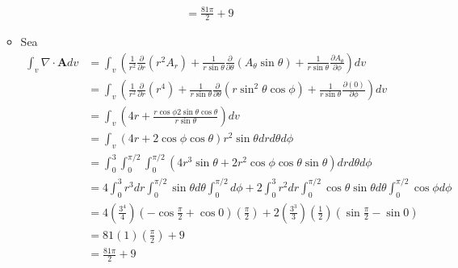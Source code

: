 \begin{problema}
\begin{enumerate}
\begin{sol}
\begin{itemize}
\begin{align*}
                &= \frac{81\pi}{2}+9
            \end{align*}
            \item Sea 
            \begin{align*}
                \int_{v} \nabla \cdot \mathbf{A} d v &=\int_v\left(\frac{1}{r^2}\frac{\partial}{\partial r}(r^2 A_r)+\frac{1}{r\sin\theta}\frac{\partial }{\partial \theta}(A_\theta \sin \theta)+\frac{1}{r\sin \theta}\frac{\partial A_\theta}{\partial \phi}\right)dv\\
                &=\int_v\left(\frac{1}{r^2}\frac{\partial}{\partial r}(r^4)+\frac{1}{r\sin\theta}\frac{\partial }{\partial \theta}(r\sin^2 \theta\cos\phi)+\frac{1}{r\sin \theta}\frac{\partial (0)}{\partial \phi}\right)dv\\
                &=\int_v\left(4r+\frac{r\cos\phi2\sin\theta \cos\theta}{r\sin\theta }\right)dv\\
                &= \int_v\left(4r+2\cos\phi\cos\theta\right)r^2\sin\theta drd\theta d\phi\\
                &= \int_{0}^{3}\int_{0}^{\pi/2}\int_{0}^{\pi/2}\left(4r^3\sin\theta +2r^2\cos\phi \cos\theta\sin\theta\right)drd\theta d\phi\\
                &= 4\int_{0}^{3}r^3dr\int_{0}^{\pi/2}\sin\theta d\theta\int_{0}^{\pi/2}d\phi+2\int_{0}^{3}r^2dr\int_{0}^{\pi/2}\cos\theta\sin\theta d\theta\int_{0}^{\pi/2}\cos\phi d\phi\\
                &= 4\left(\frac{3^4}{4}\right)\left(-\cos\frac{\pi}{2}+\cos 0\right)\left(\frac{\pi}{2}\right)+2\left(\frac{3^3}{3}\right)\left(\frac{1}{2}\right)\left(\sin\frac{\pi}{2}-\sin0\right)\\
                &= 81\left(1\right)\left(\frac{\pi}{2}\right)+9\\
                &=\frac{81\pi }{2}+9
            \end{align*}
        \end{itemize}
    \end{sol}
\end{enumerate}

\end{problema}

